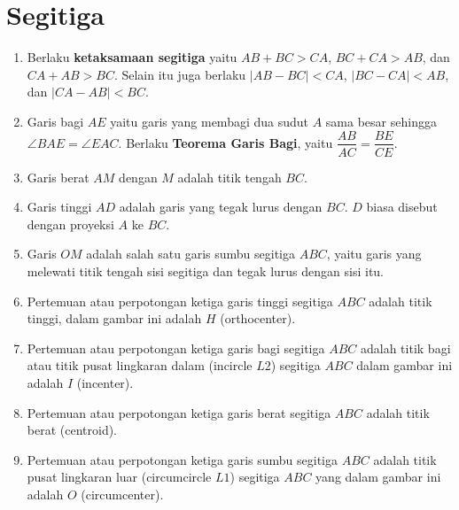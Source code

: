 \documentclass[11pt]{scrartcl}
\begin{document}
\section{Segitiga}


\begin{enumerate}
    \item Berlaku \textbf{ketaksamaan segitiga} yaitu $AB+BC>CA$, $BC+CA>AB$, dan $CA+AB>BC$. Selain itu juga berlaku $|AB-BC|<CA$, $|BC-CA|<AB$, dan $|CA-AB|<BC$.
    \item Garis bagi $AE$ yaitu garis yang membagi dua sudut $A$ sama besar sehingga $\angle BAE = \angle EAC$. Berlaku \textbf{Teorema Garis Bagi}, yaitu $\dfrac{AB}{AC}=\dfrac{BE}{CE}$.
    \item Garis berat $AM$ dengan $M$ adalah titik tengah $BC$.
    \item Garis tinggi $AD$ adalah garis yang tegak lurus dengan $BC$. $D$ biasa disebut dengan proyeksi $A$ ke $BC$.
    \item Garis $OM$ adalah salah satu garis sumbu segitiga $ABC$, yaitu garis yang melewati titik tengah sisi segitiga dan tegak lurus dengan sisi itu.
    \item Pertemuan atau perpotongan ketiga garis tinggi segitiga $ABC$ adalah titik tinggi, dalam gambar ini adalah $H$ (orthocenter).
    \item Pertemuan atau perpotongan ketiga garis bagi segitiga $ABC$ adalah titik bagi atau titik pusat lingkaran dalam (incircle $L2$) segitiga $ABC$ dalam gambar ini adalah $I$ (incenter).
    \item Pertemuan atau perpotongan ketiga garis berat segitiga $ABC$ adalah titik berat (centroid).
    \item Pertemuan atau perpotongan ketiga garis sumbu segitiga $ABC$ adalah titik pusat lingkaran luar (circumcircle $L1$) segitiga $ABC$ yang dalam gambar ini adalah $O$ (circumcenter).
\end{enumerate}
\end{document}
